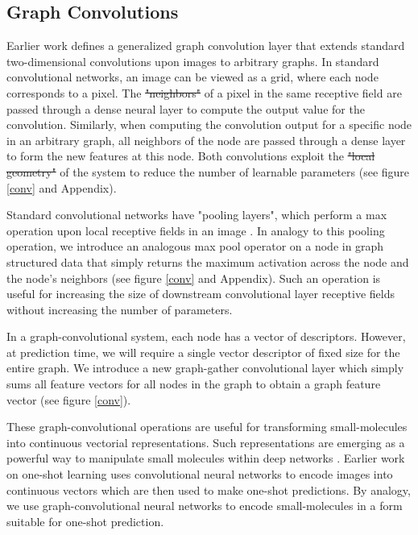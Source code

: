 \documentclass[journal=jacsat,manuscript=article]{achemso}
\providecommand{\DIFaddtex}[1]{{\protect\color{blue}\uwave{#1}}} %
\providecommand{\DIFdeltex}[1]{{\protect\color{red}\sout{#1}}}                      %
\providecommand{\DIFaddbegin}{} %
\providecommand{\DIFaddend}{} %
\providecommand{\DIFdelbegin}{} %
\providecommand{\DIFdelend}{} %
\providecommand{\DIFadd}[1]{\texorpdfstring{\DIFaddtex{#1}}{#1}} %
\providecommand{\DIFdel}[1]{\texorpdfstring{\DIFdeltex{#1}}{}} %
\begin{document}
\subsection{Graph Convolutions}
Earlier work \cite{duvenaud2015convolutional} defines a generalized graph convolution layer that extends standard two-dimensional convolutions upon images to arbitrary graphs. In standard convolutional networks, an image can be viewed as a grid, where each node corresponds to a pixel. The \DIFdelbegin \DIFdel{"neighbors" }\DIFdelend \DIFaddbegin \DIFadd{``neighbors'' }\DIFaddend of a pixel in the same receptive field are passed through a dense neural layer to compute the output value for the convolution\cite{karpathy231n}. Similarly, when computing the convolution output for a specific node in an arbitrary graph, all neighbors of the node are passed through a dense layer to form the new features at this node. Both convolutions exploit the \DIFdelbegin \DIFdel{"local geometry" }\DIFdelend \DIFaddbegin \DIFadd{``local geometry'' }\DIFaddend of the system to reduce the number of learnable parameters (see figure \ref{conv} and Appendix).

Standard convolutional networks have "pooling layers", which perform a max operation upon local receptive fields in an image \cite{karpathy231n}. In analogy to this pooling operation, we introduce an analogous max pool operator on a node in graph structured data that simply returns the maximum activation across the node and the node's neighbors (see figure \ref{conv} and Appendix). Such an operation is useful for increasing the size of downstream convolutional layer receptive fields without increasing the number of parameters.

In a graph-convolutional system, each node has a vector of descriptors. However, at prediction time, we will require a single vector descriptor of fixed size for the entire graph. We introduce a new graph-gather convolutional layer which simply sums all feature vectors for all nodes in the graph to obtain a graph feature vector (see figure \ref{conv}).

These graph-convolutional operations are useful for transforming small-molecules into continuous vectorial representations. Such representations are emerging as a powerful way to manipulate small molecules within deep networks \cite{gomez2016automatic}. Earlier work on one-shot learning uses convolutional neural networks to encode images into continuous vectors which are then used to make one-shot predictions. By analogy, we use graph-convolutional neural networks to encode small-molecules in a form suitable for one-shot prediction.
\end{document}
